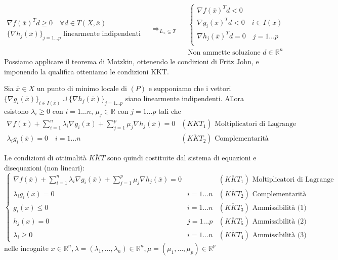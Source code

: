 $$
\begin{array}{l}
 \nabla f(\overline{x})^{T} d \geq 0\quad
\forall d \in T(X, \overline{x})   \\
\{ \nabla h_j(\overline{x})\}_{j=1\ldots p} \text{ linearmente
indipendenti}
\end{array}
\quad
\Longrightarrow_{L_{<} \subseteq T}
\quad
\begin{array}{l}
\left\{
\begin{array}{l}
  \nabla f(\overline{x})^{T}d < 0  \\
 \nabla g_i(\overline{x})^{T}d < 0 \quad i \in I(\overline{x}) \\
 \nabla h_j(\overline{x})^{T}d = 0 \quad j =1 \ldots p \\
\end{array}
\right. \\
\text{Non ammette soluzione } d \in \mathbb{R}^{n}
\end{array}
$$
Possiamo applicare il teorema di Motzkin, ottenendo le condizioni
di Fritz John, e imponendo la qualifica otteniamo le condizioni KKT.
\begin{theo}
Sia $\overline{x} \in X $ un punto di minimo locale di $(P)$ e supponiamo
che i vettori $\{ \nabla g_i(\overline{x})\}_{i \in I(\overline{x})} 
\cup
\{ \nabla h_j(\overline{x}) \}_{j=1\ldots p}
$
siano linearmente indipendenti. Allora esistono $\lambda_i \geq 0$
con $i=1\ldots n$,  $\mu_{j} \in \mathbb{R}$ con $j=1\ldots p$ tali che
$$
\begin{array}{ll}
\nabla f(\overline{x}) +
\displaystyle  \sum_{i=1}^{n} \lambda_i \nabla g_i (\overline{x})
+ \displaystyle \sum_{j=1}^{p} \mu_j \nabla h_j(\overline{x}) = 0 & 
(\overline{KKT}_1) \text{ Moltiplicatori di Lagrange }    \\
\lambda_i g_i(\overline{x})=0 \quad i =1 \ldots n &
(\overline{KKT}_2) \text{ Complementarit\`a}
\end{array}
$$
\end{theo}
Le condizioni di ottimalit\`a $\overline{KKT}$ sono quindi costituite dal sistema
di equazioni e disequazioni (non lineari):
$$
\left\{
\begin{array}{lll}
\nabla f(\overline{x}) +
\displaystyle  \sum_{i=1}^{n} \lambda_i \nabla g_i (\overline{x})
+ \displaystyle \sum_{j=1}^{p} \mu_j \nabla h_j(\overline{x}) = 0 & & 
(\overline{KKT}_1) \text{ Moltiplicatori di Lagrange }    \\
\lambda_i g_i(\overline{x})=0 & i =1 \ldots n &
(\overline{KKT}_2) \text{ Complementarit\`a} \\
g_i(x) \leq 0 & i=1\ldots n & (\overline{KKT}_3)  \text{ Ammissibilit\`a (1) } \\
h_j(x) = 0 & j=1\ldots p  & (\overline{KKT}_5)  \text{ Ammissibilit\`a (2) } \\
\lambda_i \geq 0 & i=1\ldots n  & (\overline{KKT}_4)  \text{ Ammissibilit\`a (3) }
\end{array}
\right.
$$
nelle incognite $x \in \mathbb{R}^{n}, \lambda = (\lambda_1, \ldots, \lambda_n) \in \mathbb{R}^{n}, \mu = (\mu_1, \ldots, \mu_p) \in \mathbb{R}^{p}$

